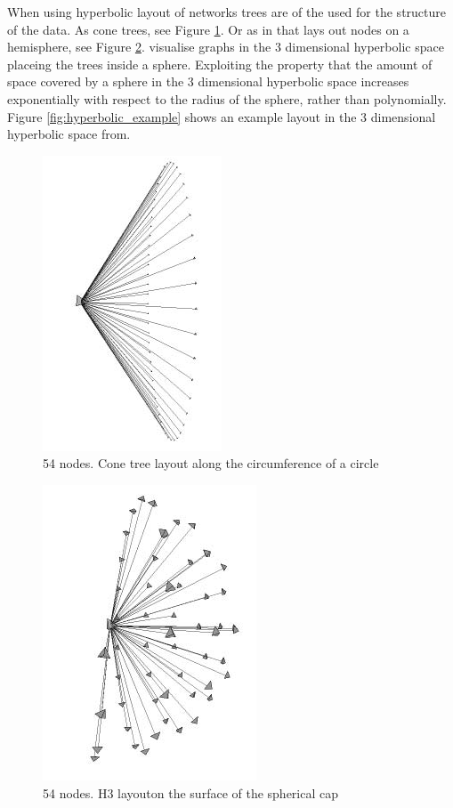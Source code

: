 \documentclass[a4paper,11pt]{kth-mag}
\begin{document}
When using hyperbolic layout of networks trees are of the used for the structure of the data. As cone trees, see Figure \ref{fig:hyperbolic_cone_tree}. Or as in \cite{636718} that lays out nodes on a hemisphere, 
see Figure \ref{hyperbolic_hemi_tree}. \cite{636718} visualise graphs in the 3 dimensional hyperbolic space placeing the trees inside a sphere. Exploiting the property that the amount of space covered by a sphere
 in the 3 dimensional hyperbolic space increases exponentially with respect to the radius of the sphere, rather than polynomially. Figure \ref{fig:hyperbolic_example} shows an example layout in the 3 dimensional 
 hyperbolic space from.
 
  \begin{figure}[!htbp]
	\centering
	\includegraphics{HyperBolicCone}
	\caption{54 nodes. Cone tree layout along the circumference
of a circle}
	\label{fig:hyperbolic_cone_tree}
\end{figure}

 \begin{figure}[!htbp]
	\centering
	\includegraphics{HyperBolicHem}
	\caption{54 nodes. H3 layouton the surface of the spherical
cap}
	\label{hyperbolic_hemi_tree}
\end{figure} 
 
\end{document}
